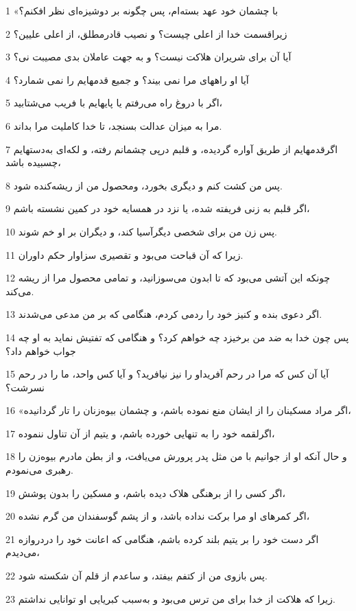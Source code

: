 \par 1 «با چشمان خود عهد بسته‌ام، پس چگونه بر دوشیزه‌ای نظر افکنم؟
\par 2 زیراقسمت خدا از اعلی چیست؟ و نصیب قادرمطلق، از اعلی علیین؟
\par 3 آیا آن برای شریران هلاکت نیست؟ و به جهت عاملان بدی مصیبت نی؟
\par 4 آیا او راههای مرا نمی بیند؟ و جمیع قدمهایم را نمی شمارد؟
\par 5 اگر با دروغ راه می‌رفتم یا پایهایم با فریب می‌شتابید،
\par 6 مرا به میزان عدالت بسنجد، تا خدا کاملیت مرا بداند.
\par 7 اگرقدمهایم از طریق آواره گردیده، و قلبم در‌پی چشمانم رفته، و لکه‌ای به‌دستهایم چسبیده باشد،
\par 8 پس من کشت کنم و دیگری بخورد، ومحصول من از ریشه‌کنده شود.
\par 9 اگر قلبم به زنی فریفته شده، یا نزد در همسایه خود در کمین نشسته باشم،
\par 10 پس زن من برای شخصی دیگرآسیا کند، و دیگران بر او خم شوند.
\par 11 زیرا که آن قباحت می‌بود و تقصیری سزاوار حکم داوران.
\par 12 چونکه این آتشی می‌بود که تا ابدون می‌سوزانید، و تمامی محصول مرا از ریشه می‌کند.
\par 13 اگر دعوی بنده و کنیز خود را ردمی کردم، هنگامی که بر من مدعی می‌شدند.
\par 14 پس چون خدا به ضد من برخیزد چه خواهم کرد؟ و هنگامی که تفتیش نماید به او چه جواب خواهم داد؟
\par 15 آیا آن کس که مرا در رحم آفریداو را نیز نیافرید؟ و آیا کس واحد، ما را در رحم نسرشت؟
\par 16 «اگر مراد مسکینان را از ایشان منع نموده باشم، و چشمان بیوه‌زنان را تار گردانیده،
\par 17 اگرلقمه خود را به تنهایی خورده باشم، و یتیم از آن تناول ننموده،
\par 18 و حال آنکه او از جوانیم با من مثل پدر پرورش می‌یافت، و از بطن مادرم بیوه‌زن را رهبری می‌نمودم.
\par 19 اگر کسی را از برهنگی هلاک دیده باشم، و مسکین را بدون پوشش،
\par 20 اگر کمرهای او مرا برکت نداده باشد، و از پشم گوسفندان من گرم نشده،
\par 21 اگر دست خود را بر یتیم بلند کرده باشم، هنگامی که اعانت خود را دردروازه می‌دیدم،
\par 22 پس بازوی من از کتفم بیفتد، و ساعدم از قلم آن شکسته شود.
\par 23 زیرا که هلاکت از خدا برای من ترس می‌بود و به‌سبب کبریایی او توانایی نداشتم.
